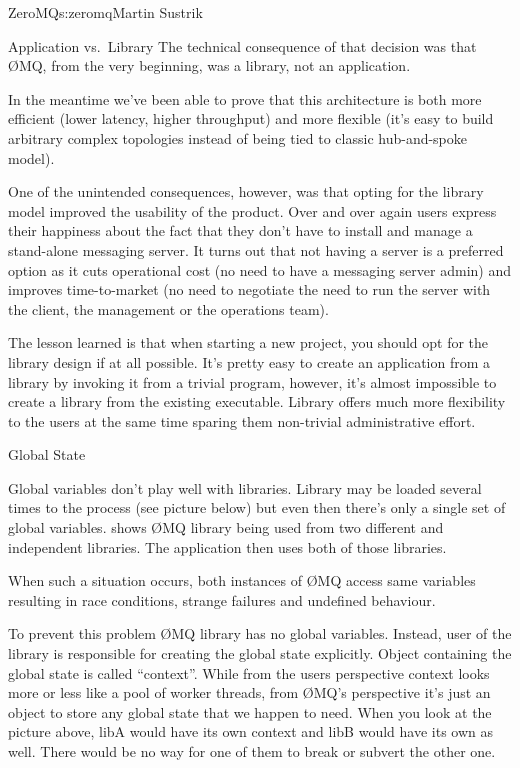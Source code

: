 \begin{aosachapter}{ZeroMQ}{s:zeromq}{Martin Sustrik}
\begin{aosasect1}{Application vs.\ Library}
The technical consequence of that decision was that ØMQ, from the very
beginning, was a library, not an application.

In the meantime we've been able to prove that this architecture is
both more efficient (lower latency, higher throughput) and more
flexible (it's easy to build arbitrary complex topologies instead of
being tied to classic hub-and-spoke model).

One of the unintended consequences, however, was that opting for the
library model improved the usability of the product. Over and over
again users express their happiness about the fact that they don't
have to install and manage a stand-alone messaging server. It turns
out that not having a server is a preferred option as it cuts
operational cost (no need to have a messaging server admin) and
improves time-to-market (no need to negotiate the need to run the
server with the client, the management or the operations team).

The lesson learned is that when starting a new project, you should opt
for the library design if at all possible. It's pretty easy to create
an application from a library by invoking it from a trivial program,
however, it's almost impossible to create a library from the existing
executable. Library offers much more flexibility to the users at the
same time sparing them non-trivial administrative effort.

\end{aosasect1}

\begin{aosasect1}{Global State}

Global variables don't play well with libraries. Library may be loaded
several times to the process (see picture below) but even then there's
only a single set of global
variables.  shows ØMQ library being
used from two different and independent libraries. The application
then uses both of those libraries.


When such a situation occurs, both instances of ØMQ access same
variables resulting in race conditions, strange failures and undefined
behaviour.

To prevent this problem ØMQ library has no global variables. Instead,
user of the library is responsible for creating the global state
explicitly. Object containing the global state is called
``context''. While from the users perspective context looks more or
less like a pool of worker threads, from ØMQ's perspective it's just
an object to store any global state that we happen to need. When you
look at the picture above, libA would have its own context and libB
would have its own as well. There would be no way for one of them to
break or subvert the other one.


\end{aosasect1}
\end{aosachapter}
